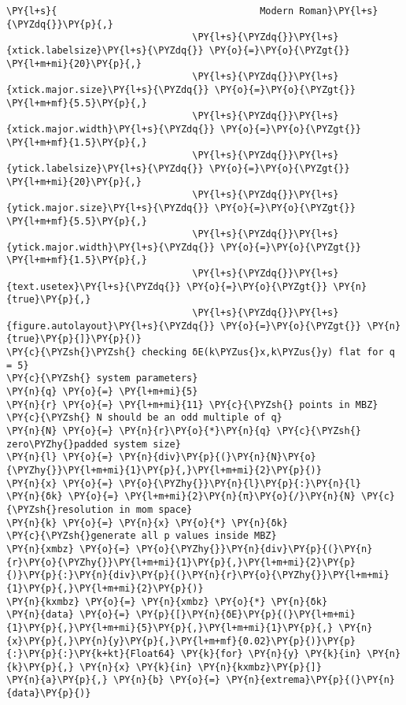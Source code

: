 \begin{Verbatim}[commandchars=\\\{\}]
\PY{l+s}{                                    Modern Roman}\PY{l+s}{\PYZdq{}}\PY{p}{,}
                                 \PY{l+s}{\PYZdq{}}\PY{l+s}{xtick.labelsize}\PY{l+s}{\PYZdq{}} \PY{o}{=}\PY{o}{\PYZgt{}} \PY{l+m+mi}{20}\PY{p}{,}
                                 \PY{l+s}{\PYZdq{}}\PY{l+s}{xtick.major.size}\PY{l+s}{\PYZdq{}} \PY{o}{=}\PY{o}{\PYZgt{}} \PY{l+m+mf}{5.5}\PY{p}{,}
                                 \PY{l+s}{\PYZdq{}}\PY{l+s}{xtick.major.width}\PY{l+s}{\PYZdq{}} \PY{o}{=}\PY{o}{\PYZgt{}} \PY{l+m+mf}{1.5}\PY{p}{,}
                                 \PY{l+s}{\PYZdq{}}\PY{l+s}{ytick.labelsize}\PY{l+s}{\PYZdq{}} \PY{o}{=}\PY{o}{\PYZgt{}} \PY{l+m+mi}{20}\PY{p}{,}
                                 \PY{l+s}{\PYZdq{}}\PY{l+s}{ytick.major.size}\PY{l+s}{\PYZdq{}} \PY{o}{=}\PY{o}{\PYZgt{}} \PY{l+m+mf}{5.5}\PY{p}{,}
                                 \PY{l+s}{\PYZdq{}}\PY{l+s}{ytick.major.width}\PY{l+s}{\PYZdq{}} \PY{o}{=}\PY{o}{\PYZgt{}} \PY{l+m+mf}{1.5}\PY{p}{,}
                                 \PY{l+s}{\PYZdq{}}\PY{l+s}{text.usetex}\PY{l+s}{\PYZdq{}} \PY{o}{=}\PY{o}{\PYZgt{}} \PY{n}{true}\PY{p}{,}
                                 \PY{l+s}{\PYZdq{}}\PY{l+s}{figure.autolayout}\PY{l+s}{\PYZdq{}} \PY{o}{=}\PY{o}{\PYZgt{}} \PY{n}{true}\PY{p}{]}\PY{p}{)}
\PY{c}{\PYZsh{}\PYZsh{} checking δE(k\PYZus{}x,k\PYZus{}y) flat for q = 5}
\PY{c}{\PYZsh{} system parameters}
\PY{n}{q} \PY{o}{=} \PY{l+m+mi}{5}
\PY{n}{r} \PY{o}{=} \PY{l+m+mi}{11} \PY{c}{\PYZsh{} points in MBZ}
\PY{c}{\PYZsh{} N should be an odd multiple of q}
\PY{n}{N} \PY{o}{=} \PY{n}{r}\PY{o}{*}\PY{n}{q} \PY{c}{\PYZsh{} zero\PYZhy{}padded system size}
\PY{n}{l} \PY{o}{=} \PY{n}{div}\PY{p}{(}\PY{n}{N}\PY{o}{\PYZhy{}}\PY{l+m+mi}{1}\PY{p}{,}\PY{l+m+mi}{2}\PY{p}{)}
\PY{n}{x} \PY{o}{=} \PY{o}{\PYZhy{}}\PY{n}{l}\PY{p}{:}\PY{n}{l}
\PY{n}{δk} \PY{o}{=} \PY{l+m+mi}{2}\PY{n}{π}\PY{o}{/}\PY{n}{N} \PY{c}{\PYZsh{}resolution in mom space}
\PY{n}{k} \PY{o}{=} \PY{n}{x} \PY{o}{*} \PY{n}{δk}
\PY{c}{\PYZsh{}generate all p values inside MBZ}
\PY{n}{xmbz} \PY{o}{=} \PY{o}{\PYZhy{}}\PY{n}{div}\PY{p}{(}\PY{n}{r}\PY{o}{\PYZhy{}}\PY{l+m+mi}{1}\PY{p}{,}\PY{l+m+mi}{2}\PY{p}{)}\PY{p}{:}\PY{n}{div}\PY{p}{(}\PY{n}{r}\PY{o}{\PYZhy{}}\PY{l+m+mi}{1}\PY{p}{,}\PY{l+m+mi}{2}\PY{p}{)}
\PY{n}{kxmbz} \PY{o}{=} \PY{n}{xmbz} \PY{o}{*} \PY{n}{δk}
\PY{n}{data} \PY{o}{=} \PY{p}{[}\PY{n}{δE}\PY{p}{(}\PY{l+m+mi}{1}\PY{p}{,}\PY{l+m+mi}{5}\PY{p}{,}\PY{l+m+mi}{1}\PY{p}{,} \PY{n}{x}\PY{p}{,}\PY{n}{y}\PY{p}{,}\PY{l+m+mf}{0.02}\PY{p}{)}\PY{p}{:}\PY{p}{:}\PY{k+kt}{Float64} \PY{k}{for} \PY{n}{y} \PY{k}{in} \PY{n}{k}\PY{p}{,} \PY{n}{x} \PY{k}{in} \PY{n}{kxmbz}\PY{p}{]}
\PY{n}{a}\PY{p}{,} \PY{n}{b} \PY{o}{=} \PY{n}{extrema}\PY{p}{(}\PY{n}{data}\PY{p}{)}


\end{Verbatim}
